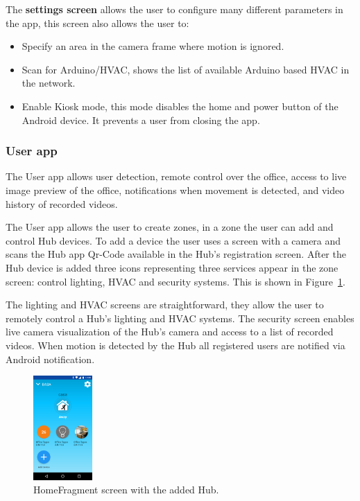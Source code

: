 \documentclass[conference]{IEEEtran}
\begin{document}
The \textbf{settings screen} allows the user to configure many different parameters in the app, this screen also allows the user to:
\begin{itemize}
 
  \item Specify an area in the camera frame where motion is ignored.
  
  \item Scan for Arduino/HVAC, shows the list of available Arduino based HVAC in the network.
  
  \item Enable Kiosk mode, this mode disables the home and power button of the Android device. It prevents a user from closing the app. 
    
  
\end{itemize}







\subsubsection{User app}


The User app allows user detection, remote control over the office, access to live image preview of the office, notifications when movement is detected, and video history of recorded videos.

The User app allows the user to create zones, in a zone the user can add and control Hub devices. To add a device the user uses a screen with a camera and scans the Hub app Qr-Code available in the Hub's registration screen.
After the Hub device is added three icons representing three services appear in the zone screen: control lighting, \ac{HVAC} and security systems. This is shown in Figure~\ref{imp_user_app}.

The lighting and \ac{HVAC} screens are straightforward, they allow the user to remotely control a Hub's lighting and \ac{HVAC} systems. The security screen enables live camera visualization of the Hub's camera and access to a list of recorded videos. When motion is detected by the Hub all registered users are notified via Android notification. 


\begin{figure}[h]
\centering
\includegraphics[width=0.2\textwidth]{Figures/imp_home_user_app}
\caption{HomeFragment screen with the added Hub.}
\label{imp_user_app}
\end{figure}
\end{document}
